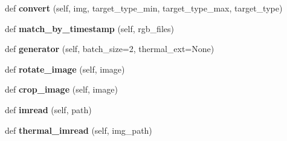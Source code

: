 \begin{DoxyCompactItemize}
def {\bfseries convert} (self, img, target\+\_\+type\+\_\+min, target\+\_\+type\+\_\+max, target\+\_\+type)
\item 
\mbox{\label{classmodels_1_1data__loader_1_1DataLoader_a4d7dcb2e81c02ca79339cbe76c7c75b4}} 
def {\bfseries match\+\_\+by\+\_\+timestamp} (self, rgb\+\_\+files)
\item 
\mbox{\label{classmodels_1_1data__loader_1_1DataLoader_a006045df9546e144d984c9b82a2ab97f}} 
def {\bfseries generator} (self, batch\+\_\+size=2, thermal\+\_\+ext=None)
\item 
\mbox{\label{classmodels_1_1data__loader_1_1DataLoader_abc55b3f3025965c0767c346f447536d8}} 
def {\bfseries rotate\+\_\+image} (self, image)
\item 
\mbox{\label{classmodels_1_1data__loader_1_1DataLoader_a643258fefcc8f2509616c04c210cb2ec}} 
def {\bfseries crop\+\_\+image} (self, image)
\item 
\mbox{\label{classmodels_1_1data__loader_1_1DataLoader_a77a10cb1e2ae7e437401d6c51b3df47f}} 
def {\bfseries imread} (self, path)
\item 
\mbox{\label{classmodels_1_1data__loader_1_1DataLoader_a4f3a1e7f63ad5dac770712b8ac7bbca5}} 
def {\bfseries thermal\+\_\+imread} (self, img\+\_\+path)
\end{DoxyCompactItemize}
